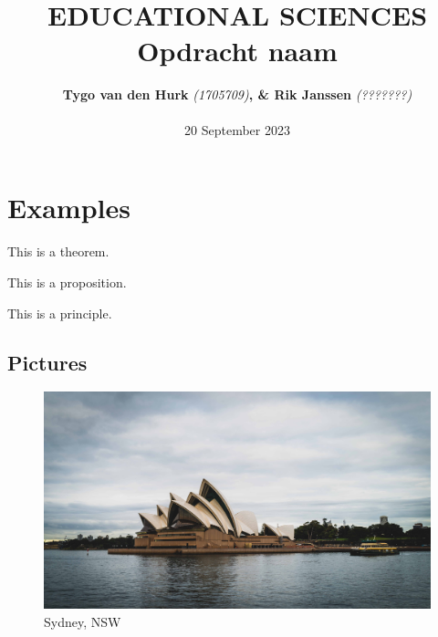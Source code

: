 \documentclass{article}
\begin{document}
    \title{ 
        \normalsize 
        \textsc{} \\
        [2.0cm]
        \HRule{1.5pt} \\
        \LARGE \textbf{
            \uppercase{
             Educational sciences}
        \HRule{2.0pt} \\ 
        [0.6cm] 
        \LARGE{
            Opdracht naam} 
        \vspace*{
            10\baselineskip}}}
    \date{}
    \author{
        \textbf{Tygo van den Hurk} \textit{(1705709)}\textbf{, \& Rik Janssen} 
        \textit{(???????)} \\ 
        \\
        20 September 2023}
    \maketitle
    \newpage
    \tableofcontents
    \newpage
    \section{Examples}
    \begin{theorem}
        This is a theorem.
    \end{theorem}
    \begin{proposition}
        This is a proposition.
    \end{proposition}
    \begin{principle}
        This is a principle.
    \end{principle}
    \subsection{Pictures}
    \begin{figure}[htbp]
        \center
        \includegraphics[scale=0.06]{images/photo.jpg}
        \caption{Sydney, NSW}
    \end{figure}
\end{document}
